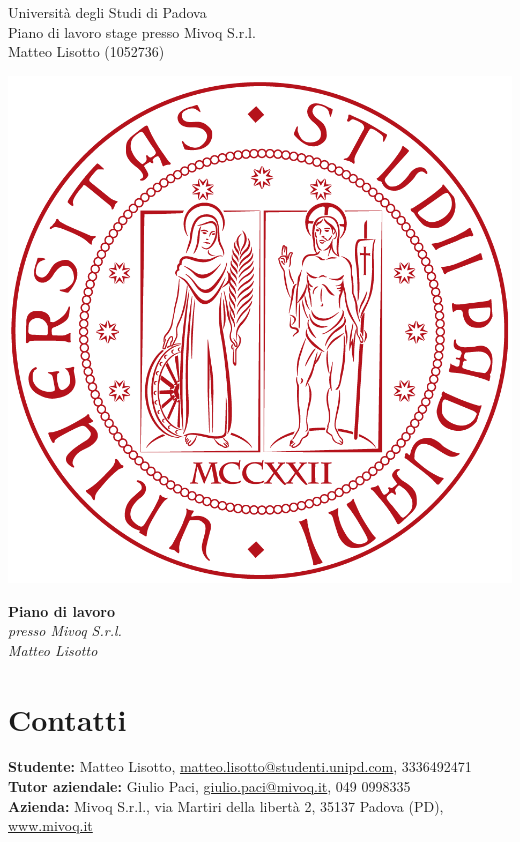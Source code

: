 \documentclass[11pt,notitlepage]{article}
\begin{document}
	
\noindent
\parbox{0.7\columnwidth}{Università degli Studi di Padova\\
	Piano di lavoro stage presso Mivoq S.r.l.\\
	Matteo Lisotto (1052736)}%
\parbox{0.3\columnwidth}{
	\hfill \includegraphics[scale=0.08]{immagini/logo-unipd.png}}

\bigskip
\begin{center}
{\Huge \textbf{Piano di lavoro}} \\ \bigskip
	{\Large \textit{presso Mivoq S.r.l.}}\\ \bigskip
	{\Large \textit{Matteo Lisotto}}
\end{center}

\section*{Contatti}
\textbf{Studente:} Matteo Lisotto, \href{mailto:matteo.lisotto@studenti.unipd.com}{matteo.lisotto@studenti.unipd.com}, 3336492471 \\
\textbf{Tutor aziendale:} Giulio Paci, \href{mailto:giulio.paci@mivoq.it}{giulio.paci@mivoq.it}, 049 0998335 \\
\textbf{Azienda:} Mivoq S.r.l., via Martiri della libertà 2, 35137 Padova (PD), \href{www.mivoq.it}{www.mivoq.it}
\end{document}
